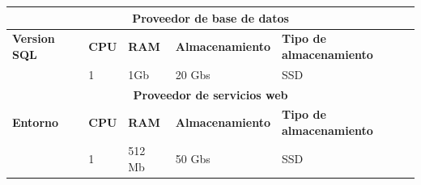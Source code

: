 \documentclass[10pt]{article}
\begin{document}
\begin{table}[H]
    \centering
    \begin{tabular}{|l |l |l |l |l |}
        \hline
        \multicolumn{5}{|c|}{\textbf{Proveedor de base de datos}}                                                                                \\
        \hline
        \centering\textbf{Version SQL}                 & \textbf{CPU} & \textbf{RAM} & \textbf{Almacenamiento} & \textbf{Tipo de almacenamiento} \\ \hline
        \centering{Sqlserver express 14.00.3356.20.v1} & {1}          & {1Gb}        & {20 Gbs}                & {SSD}                           \\ \hline
        \hline
        \multicolumn{5}{|c|}{\textbf{Proveedor de servicios web}}                                                                                \\
        \hline
        \centering\textbf{Entorno}                     & \textbf{CPU} & \textbf{RAM} & \textbf{Almacenamiento} & \textbf{Tipo de almacenamiento} \\ \hline
        \centering{.NET Core 3.1 (C\#/PowerShell)}     & {1}          & {512 Mb}     & {50 Gbs}                & {SSD}                           \\ \hline
    \end{tabular}
\end{table}
\newpage

\justify
\end{document}
